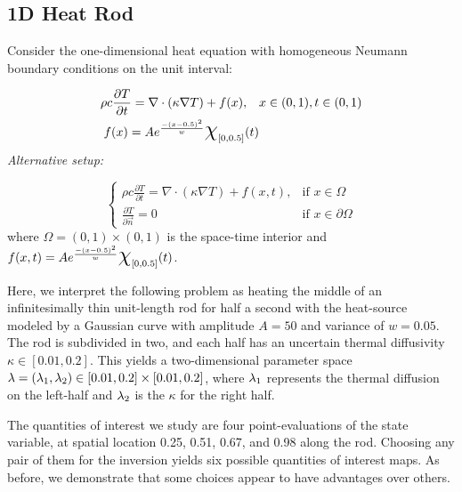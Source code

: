 \subsection{1D Heat Rod}\label{ex:heat-set-sample}
Consider the one-dimensional heat equation with homogeneous Neumann boundary conditions on the unit interval:

\begin{equation}
\begin{split}
\rho c \frac{\partial T}{\partial t} = \nabla \cdot ( \kappa \nabla T) + f(x), \quad & x\in (0,1), t\in (0,1) \\
f(x) = A e^\frac{- (x-0.5)^2}{w} \Chi_{[0,0.5]}(t)
\end{split}
\end{equation}
\emph{Alternative setup: }

\begin{equation}
\begin{cases}
\rho c \frac{\partial T}{\partial t} = \nabla \cdot ( \kappa \nabla T) + f(x,t), & \text{if } x\in \Omega \\
\frac{\partial T}{\partial \vec{n}} = 0 & \text{if } x\in \partial \Omega
\end{cases}
\end{equation}
where $\Omega = (0,1)\times (0,1)$ is the space-time interior and $f(x,t) = A e^\frac{- (x-0.5)^2}{w} \Chi_{[0,0.5]}(t)$.

Here, we interpret the following problem as heating the middle of an infinitesimally thin unit-length rod for half a second with the heat-source modeled by a Gaussian curve with amplitude $A=50$ and variance of $w=0.05$.
The rod is subdivided in two, and each half has an uncertain thermal diffusivity $\kappa \in [0.01, 0.2]$.
This yields a two-dimensional parameter space $\lambda = (\lambda_1, \lambda_2) \in [0.01, 0.2]\times [0.01, 0.2]$, where $\lambda_1$ represents the thermal diffusion on the left-half and $\lambda_2$ is the $\kappa$ for the right half.

The quantities of interest we study are four point-evaluations of the state variable, at spatial location 0.25, 0.51, 0.67, and 0.98 along the rod.
Choosing any pair of them for the inversion yields six possible quantities of interest maps.
As before, we demonstrate that some choices appear to have advantages over others.


